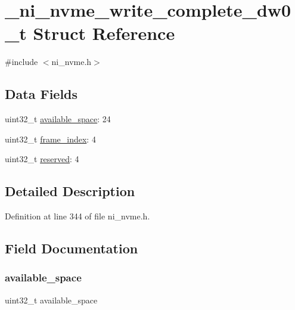 \hypertarget{struct__ni__nvme__write__complete__dw0__t}{}\section{\+\_\+ni\+\_\+nvme\+\_\+write\+\_\+complete\+\_\+dw0\+\_\+t Struct Reference}
\label{struct__ni__nvme__write__complete__dw0__t}


{\ttfamily \#include $<$ni\+\_\+nvme.\+h$>$}

\subsection*{Data Fields}
\begin{DoxyCompactItemize}
\item 
uint32\+\_\+t \mbox{\hyperlink{struct__ni__nvme__write__complete__dw0__t_a3bdaf39d5557532933d970bc43c25d14}{available\+\_\+space}}\+: 24
\item 
uint32\+\_\+t \mbox{\hyperlink{struct__ni__nvme__write__complete__dw0__t_a05f60adb7ca73495905c236f23d474d6}{frame\+\_\+index}}\+: 4
\item 
uint32\+\_\+t \mbox{\hyperlink{struct__ni__nvme__write__complete__dw0__t_aa43c4c21b173ada1b6b7568956f0d650}{reserved}}\+: 4
\end{DoxyCompactItemize}


\subsection{Detailed Description}


Definition at line 344 of file ni\+\_\+nvme.\+h.



\subsection{Field Documentation}
\mbox{\label{struct__ni__nvme__write__complete__dw0__t_a3bdaf39d5557532933d970bc43c25d14}} 
\subsubsection{\texorpdfstring{available\_space}{available\_space}}
{\footnotesize\ttfamily uint32\+\_\+t available\+\_\+space}



